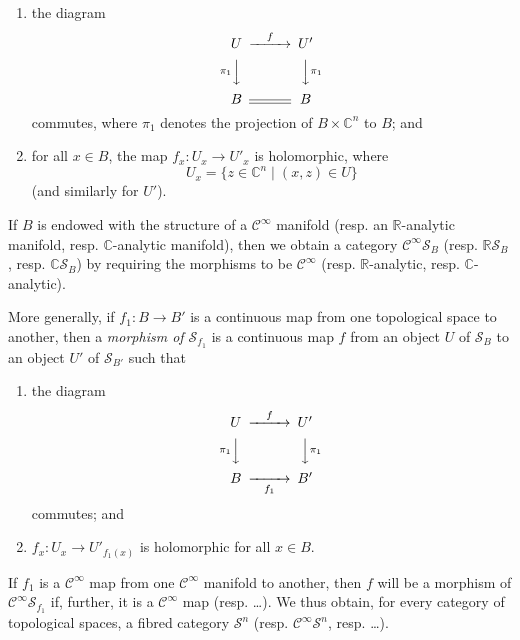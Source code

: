 \documentclass[british]{article}
\providecommand{\tightlist}{%
\setlength{\itemsep}{0pt}\setlength{\parskip}{0pt}}
\newcommand{\oldpage}[1]{\marginpar{\footnotesize$\Big\vert$ \textit{p.~#1}}}
\begin{document}
\begin{enumerate}
\def\labelenumi{\arabic{enumi}.}
\tightlist
\item
  the diagram \[
     \begin{CD}
       U @>f>> U'
     \\@V{\pi_1}VV @VV{\pi_1}V
     \\B @= B
     \end{CD}
   \] commutes, where \(\pi_1\) denotes the projection of
  \(B\times\mathbb{C}^n\) to \(B\); and
\item
  for all \(x\in B\), the map \(f_x\colon U_x\to U'_x\) is holomorphic,
  where \[
     U_x = \{z\in\mathbb{C}^n \mid (x,z)\in U\}
   \] (and similarly for \(U'\)).
\end{enumerate}

If \(B\) is endowed with the structure of a \(\mathscr{C}^\infty\)
manifold (resp. an \(\mathbb{R}\)-analytic manifold, resp.
\(\mathbb{C}\)-analytic manifold), then we obtain a category
\(\mathscr{C}^\infty\mathscr{S}_B\) (resp. \(\mathbb{R}\mathscr{S}_B\),
resp. \(\mathbb{C}\mathscr{S}_B\)) by requiring the morphisms to be
\(\mathscr{C}^\infty\) (resp. \(\mathbb{R}\)-analytic, resp.
\(\mathbb{C}\)-analytic).

More generally, if \(f_1\colon B\to B'\) is a continuous map from one
topological space to another, then a \emph{morphism of
\(\mathscr{S}_{f_1}\)} is a continuous map \(f\) from an object \(U\) of
\(\mathscr{S}_B\) to an object \(U'\) of \(\mathscr{S}_{B'}\) such that

\begin{enumerate}
\def\labelenumi{\arabic{enumi}.}
\tightlist
\item
  the diagram \[
     \begin{CD}
       U @>f>> U'
     \\@V{\pi_1}VV @VV{\pi_1}V
     \\B @>>{f_1}> B'
     \end{CD}
   \] commutes; and
\item
  \(f_x\colon U_x\to U'_{f_1(x)}\) is holomorphic for all \(x\in B\).
\end{enumerate}

\oldpage{2-02}

If \(f_1\) is a \(\mathscr{C}^\infty\) map from one
\(\mathscr{C}^\infty\) manifold to another, then \(f\) will be a
morphism of \(\mathscr{C}^\infty\mathscr{S}_{f_1}\) if, further, it is a
\(\mathscr{C}^\infty\) map (resp. \ldots). We thus obtain, for every
category of topological spaces, a fibred category \(\mathscr{S}^n\)
(resp. \(\mathscr{C}^\infty\mathscr{S}^n\), resp. \ldots).
\end{document}
